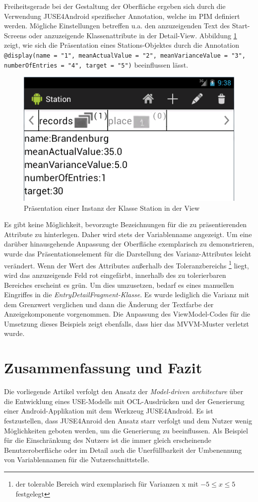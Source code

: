 \documentclass[a4paper,twoside]{article}
\begin{document}
Freiheitsgerade bei der Gestaltung der Oberfläche ergeben sich durch die Verwendung JUSE4Android spezifischer Annotation, welche im PIM definiert werden. Mögliche Einstellungen betreffen u.a. den anzuzeigenden Text des Start-Screens oder anzuzeigende Klassenattribute in der Detail-View. \cite[S.19]{SilvaMasterThesis} Abbildung \ref{fig:StationView} zeigt, wie sich die Präsentation eines Stations-Objektes durch die Annotation \texttt{@display(name = "1", meanActualValue = "2", meanVarianceValue = "3", numberOfEntries = "4", target = "5")} beeinflussen lässt.
\begin{figure}[!h]
	\centering
	\includegraphics[scale=.6]{pics/StationView.png}
	\caption{Präsentation einer Instanz der Klasse Station in der View}
	\label{fig:StationView}
\end{figure}
Es gibt keine Möglichkeit, bevorzugte Bezeichnungen für die zu präsentierenden Attribute zu hinterlegen. Daher wird stets der Variablenname angezeigt. 
Um eine darüber hinausgehende Anpassung der Oberfläche exemplarisch zu demonstrieren, wurde das Präsentationselement für die Darstellung des Varianz-Attributes leicht verändert. Wenn der Wert des Attributes außerhalb des Toleranzbereichs \footnote{der tolerable Bereich wird exemplarisch für Varianzen x mit \(-5 \le x \le 5\) festgelegt} liegt, wird das anzuzeigende Feld rot eingefärbt, innerhalb des zu tolerierbaren Bereiches erscheint es grün. Um dies umzusetzen, bedarf es eines manuellen Eingriffes in die \textit{EntryDetailFragment-Klasse}. Es wurde lediglich die Varianz mit dem Grenzwert verglichen und dann die Änderung der Textfarbe der Anzeigekomponente vorgenommen. Die Anpassung des ViewModel-Codes für die Umsetzung dieses Beispiels zeigt ebenfalls, dass hier das MVVM-Muster verletzt wurde.

\section{Zusammenfassung und Fazit}
Die vorliegende Artikel verfolgt den Ansatz der \textit{Model-driven architecture} über die Entwicklung eines USE-Modells mit OCL-Ausdrücken und der Generierung einer Android-Applikation mit dem Werkzeug JUSE4Android. Es ist festzustellen, dass JUSE4Anroid den Ansatz starr verfolgt und dem Nutzer wenig Möglichkeiten geboten werden, um die Generierung zu beeinflussen. Als Beispiel für die Einschränkung des Nutzers ist die immer gleich erscheinende Benutzeroberfläche oder im Detail auch die Unerfüllbarkeit der Umbenennung von Variablennamen für die Nutzerschnittstelle. 
\end{document}

